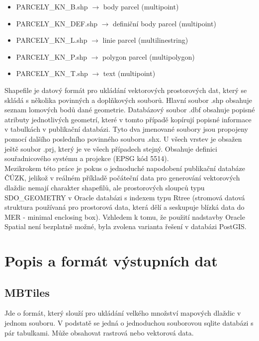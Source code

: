 \documentclass[12pt]{article}
\begin{document}
\begin{itemize}
\item PARCELY\_KN\_B.shp $\rightarrow$ body parcel (multipoint)
\item PARCELY\_KN\_DEF.shp $\rightarrow$ definiční body parcel (multipoint)
\item PARCELY\_KN\_L.shp $\rightarrow$ linie parcel (multilinestring)
\item PARCELY\_KN\_P.shp $\rightarrow$ polygon parcel (multipolygon)
\item PARCELY\_KN\_T.shp $\rightarrow$ text (multipoint)
\end{itemize}

Shapefile je datový formát pro ukládání vektorových prostorových dat, který se skládá s několika povinných a doplňkových souborů. Hlavní soubor .shp obsahuje seznam lomových bodů dané geometrie. Databázový soubor .dbf obsahuje popisné atributy jednotlivých geometrí, které v tomto případě kopírují popisné informace v tabulkách v publikační databázi. Tyto dva jmenované soubory jsou propojeny pomocí dalšího posledního povinného souboru .shx. U všech vrstev je obsažen ještě soubor .prj, který je ve všech případech stejný. Obsahuje definici souřadnicového systému a projekce (EPSG kód 5514). \\
\indent Mezikrokem této práce je pokus o jednoduché napodobení publikační databáze ČÚZK, jelikož v reálném příkladě počáteční data pro generování vektorových dlaždic nemají charakter shapefilů, ale prostorových sloupců typu SDO\_GEOMETRY v Oracle databázi s indexem typu Rtree  (stromová datová struktura používaná pro prostorová data, která dělí a seskupuje blízká data do MER - minimal enclosing box). Vzhledem k tomu, že použití nadstavby Oracle Spatial není bezplatně možné, byla zvolena varianta řešení v databázi PostGIS.



\clearpage 
\section{Popis a formát výstupních dat}

\subsection{MBTiles}
Jde o formát, který slouží pro ukládání velkého množství mapových dlaždic v jednom souboru. V podstatě se jedná o jednoduchou souborovou sqlite databázi s pár tabulkami. Může obsahovat rastrová nebo vektorová data.
\end{document}
